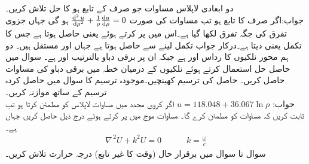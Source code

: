 دو ابعادی لاپلاس مساوات جو صرف  کے تابع ہو کا حل تلاش کریں۔\\
جواب:\quad اگر  صرف  کا تابع ہو تب مساوات  کی صورت
$\frac{\dif^{\,2}u}{\dif \rho^2}+\frac{1}{\rho}\frac{\dif u}{\dif \rho}=0$
ہو گی جہاں جزوی تفرق کی جگہ تفرق لکھا گیا ہے۔اس میں  پر کرتے ہوئے  یعنی  حاصل ہوتا ہے جس کا  تکمل  یعنی 
 دیتا ہے۔درکار جواب تکمل لینے سے  حاصل ہوتا ہے جہاں  اور  مستقل ہیں۔
\quad 
دو ہم محور نلکیوں کا رداس  اور  ہے جبکہ ان پر برقی دباو بالترتیب
  اور  ہے۔ سوال  میں حاصل حل استعمال کرتے ہوئے نلکیوں کے درمیان خطہ میں برقی دباو کی مساوات حاصل کریں۔ حاصل  کی ترسیم کھینچیں۔موجودہ ترسیم کا سوال  میں حاصل کردہ ترسیم کے ساتھ موازنہ کریں۔\\
جواب:\quad
$u=118.048+36.067\ln \rho$
\quad
اگر کروی محدد میں  مساوات لاپلاس  کو مطمئن کرتا ہو تب ثابت کریں کہ  مساوات  کو مطمئن کرے گا۔
\quad
مساوات موج  میں  پر کرتے ہوئے درج ذیل  حاصل کریں جہاں  ہے۔
\begin{align*}
\nabla^{\,2}U+k^2U=0\quad \quad \quad k=\frac{\omega}{c}
\end{align*}
سوال  تا سوال  میں برقرار حال (وقت کا غیر تابع) درجہ حرارت  تلاش کریں۔

